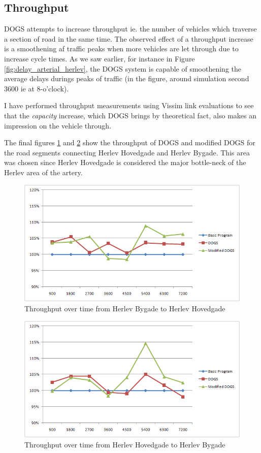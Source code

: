 \subsection{Throughput}
DOGS attempts to increase throughput ie. the number of vehicles which traverse a section of road in the same time. The observed effect of a throughput increase is a smoothening af traffic peaks when more vehicles are let through due to increase cycle times. As we saw earlier, for instance in Figure \ref{fig:delay_arterial_herlev}, the DOGS system is capable of smoothening the average delays durings peaks of traffic (in the figure, around simulation second 3600 ie at 8-o'clock).

I have performed throughput measurements using Vissim link evaluations to see that the \textit{capacity} increase, which DOGS brings by theoretical fact, also makes an impression on the vehicle through.

The final figures \ref{fig:volume_hb-hh} and \ref{fig:volume_hh-hb} show the throughput of DOGS and modified DOGS for the road segments connecting Herlev Hovedgade and Herlev Bygade. This area was chosen since Herlev Hovedgade is considered the major bottle-neck of the Herlev area of the artery.

\begin{figure}[ht]
\centering
\includegraphics[scale=0.30]{volume_hb-hh.png}
\caption{Throughput over time from Herlev Bygade to Herlev Hovedgade}
\label{fig:volume_hb-hh} 
\end{figure}

\begin{figure}[ht]
\centering
\includegraphics[scale=0.30]{volume_hh-hb.png}
\caption{Throughput over time from Herlev Hovedgade to Herlev Bygade}
\label{fig:volume_hh-hb} 
\end{figure}

